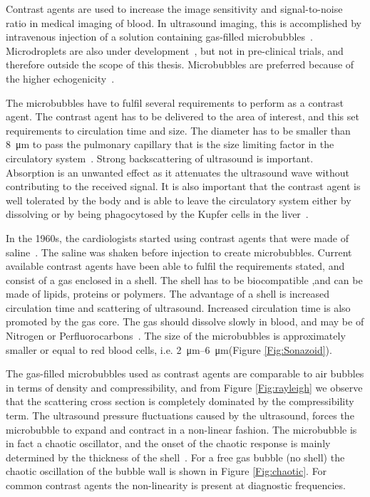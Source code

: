 Contrast agents are used to increase the image sensitivity and signal-to-noise ratio in medical imaging of blood. In ultrasound imaging, this is accomplished by intravenous injection of a solution containing gas-filled microbubbles~\cite{Paradossi2010}. Microdroplets are also under development~\cite{Soman2006}, but not in pre-clinical trials, and therefore outside the scope of this thesis. Microbubbles are preferred because of the higher echogenicity~\cite{Talu2008}.

The microbubbles have to fulfil several requirements to perform as a contrast agent. The contrast agent has to be delivered to the area of interest, and this set requirements to circulation time and size. The diameter has to be smaller than \SI{8}{\micro\metre} to pass the pulmonary capillary that is the size limiting factor in the circulatory system~\cite{Tickner1980}. Strong backscattering of ultrasound is important. Absorption is an unwanted effect as it attenuates the ultrasound wave without contributing to the received signal. It is also important that the contrast agent is well tolerated by the body and is able to leave the circulatory system either by dissolving or by being phagocytosed by the Kupfer cells in the liver~\cite{Healey2012}.

In the 1960s, the cardiologists started using contrast agents that were made of saline~\cite{Laboratories1997}. The saline was shaken before injection to create microbubbles. Current available contrast agents have been able to fulfil the requirements stated, and consist of a gas enclosed in a shell. The shell has to be biocompatible ,and can be made of lipids, proteins or polymers. The advantage of a shell is increased circulation time and scattering of ultrasound. Increased circulation time is also promoted by the gas core. The gas should dissolve slowly in blood, and may be of Nitrogen or Perfluorocarbons~\cite{Lindner2004}.  The size of the microbubbles is approximately smaller or equal to red blood cells, i.e. \SIrange{2}{6}{\micro\metre}(Figure \ref{Fig:Sonazoid}).

The gas-filled microbubbles used as contrast agents are comparable to air bubbles in terms of density and compressibility, and from Figure \ref{Fig:rayleigh} we observe that the scattering cross section is completely dominated by the compressibility term. The ultrasound pressure fluctuations caused by the ultrasound, forces the microbubble to expand and contract in a non-linear fashion. The microbubble is in fact a chaotic oscillator, and the onset of the chaotic response is mainly determined by the thickness of the shell~\cite{Macdonald2006}. For a free gas bubble (no shell) the chaotic oscillation of the bubble wall is shown in Figure \ref{Fig:chaotic}. For common contrast agents the non-linearity is present at diagnostic frequencies.

